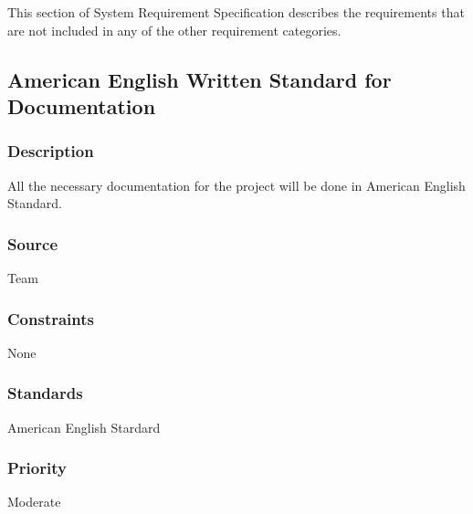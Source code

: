 This section of System Requirement Specification describes the requirements that are not included in any of the other requirement categories. 

\subsection{American English Written Standard for Documentation}
\subsubsection{Description}
All the necessary documentation for the project will be done in American English Standard. 
\subsubsection{Source}
Team
\subsubsection{Constraints}
None
\subsubsection{Standards}
American English Stardard
\subsubsection{Priority}
Moderate
